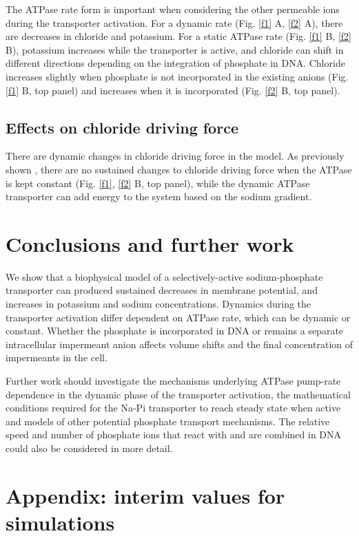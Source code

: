\documentclass[11pt]{article}[]
\begin{document}
The ATPase rate form is important when considering the other permeable ions during the transporter activation. For a dynamic rate (Fig. \ref{f1} A, \ref{f2} A), there are decreases in chloride and potassium. For a static ATPase rate (Fig. \ref{f1} B, \ref{f2} B), potassium increases while the transporter is active, and chloride can shift in different directions depending on the integration of phosphate in DNA. Chloride increases slightly when phosphate is not incorporated in the existing anions (Fig. \ref{f1} B, top panel) and increases when it is incorporated (Fig. \ref{f2} B, top panel).

\subsection{Effects on chloride driving force}
There are dynamic changes in chloride driving force in the model. As previously shown \cite{Dusterwald2018}, there are no sustained changes to chloride driving force when the ATPase is kept constant (Fig. \ref{f1}, \ref{f2} B, top panel), while the dynamic ATPase transporter can add energy to the system based on the sodium gradient.

\section{Conclusions and further work}

We show that a biophysical model of a selectively-active sodium-phosphate transporter can produced sustained decreases in membrane potential, and increases in potassium and sodium concentrations. Dynamics during the transporter activation differ dependent on ATPase rate, which can be dynamic or constant. Whether the phosphate is incorporated in DNA or remains a separate intracellular impermeant anion affects volume shifts and the final concentration of impermeants in the cell.

Further work should investigate the mechanisms underlying ATPase pump-rate dependence in the dynamic phase of the transporter activation, the mathematical conditions required for the Na-Pi transporter to reach steady state when active and models of other potential phosphate transport mechanisms. The relative speed and number of phosphate ions that react with and are combined in DNA could also be considered in more detail.




\section{Appendix: interim values for simulations \label{app}}
\end{document}
